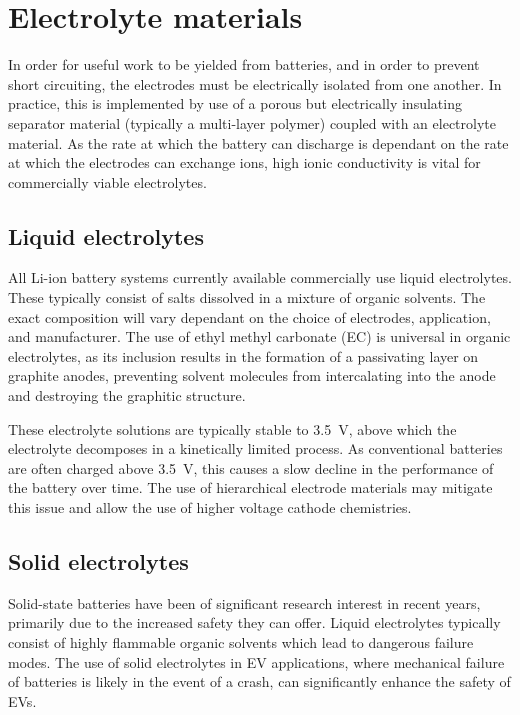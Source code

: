 \newpage
\section{Electrolyte materials}
In order for useful work to be yielded from batteries, and in order to prevent short circuiting, the electrodes must be electrically isolated from one another.\cite{Palacin2009}
In practice, this is implemented by use of a porous but electrically insulating separator material (typically a multi-layer polymer) coupled with an electrolyte material.
As the rate at which the battery can discharge is dependant on the rate at which the electrodes can exchange  ions, high ionic conductivity is vital for commercially viable electrolytes.


\subsection{Liquid electrolytes}
All Li-ion battery systems currently available commercially use liquid electrolytes.\cite{Famprikis2019}
These typically consist of  salts dissolved in a mixture of organic solvents.
The exact composition will vary dependant on the choice of electrodes, application, and manufacturer.
The use of ethyl methyl carbonate (EC) is universal in organic electrolytes, as its inclusion results in the formation of a passivating layer on graphite anodes, preventing solvent molecules from intercalating into the anode and destroying the graphitic structure.\cite{Palacin2009}

These electrolyte solutions are typically stable to \SI{3.5}{\volt}, above which the electrolyte decomposes in a kinetically limited process.
As conventional batteries are often charged above \SI{3.5}{\volt}, this causes a slow decline in the performance of the battery over time.
The use of hierarchical electrode materials may mitigate this issue and allow the use of higher voltage cathode chemistries. \cite{Zhou2018}

\subsection{Solid electrolytes}
Solid-state batteries have been of significant research interest in recent years, primarily due to the increased safety they can offer.\cite{Famprikis2019, Zhang2018, Manthiram2017a, Janek2016}
Liquid electrolytes typically consist of highly flammable organic solvents which lead to dangerous failure modes.
The use of solid electrolytes in EV applications, where mechanical failure of batteries is likely in the event of a crash, can significantly enhance the safety of EVs.

